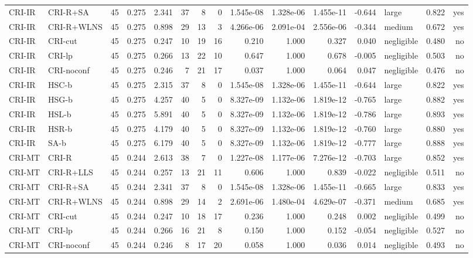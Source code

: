 \begin{table}[htbp]
\begin{tabular}{llrrrrrrrrrrlrr}
CRI-IR & CRI-R+SA & 45 & 0.275 & 2.341 & 37 & 8 & 0 & 1.545e-08 & 1.328e-06 & 1.455e-11 & -0.644 & large & 0.822 & yes \\
CRI-IR & CRI-R+WLNS & 45 & 0.275 & 0.898 & 29 & 13 & 3 & 4.266e-06 & 2.091e-04 & 2.556e-06 & -0.344 & medium & 0.672 & yes \\
CRI-IR & CRI-cut & 45 & 0.275 & 0.247 & 10 & 19 & 16 & 0.210 & 1.000 & 0.327 & 0.040 & negligible & 0.480 & no \\
CRI-IR & CRI-lp & 45 & 0.275 & 0.266 & 13 & 22 & 10 & 0.647 & 1.000 & 0.678 & -0.005 & negligible & 0.503 & no \\
CRI-IR & CRI-noconf & 45 & 0.275 & 0.246 & 7 & 21 & 17 & 0.037 & 1.000 & 0.064 & 0.047 & negligible & 0.476 & no \\
CRI-IR & HSC-b & 45 & 0.275 & 2.315 & 37 & 8 & 0 & 1.545e-08 & 1.328e-06 & 1.455e-11 & -0.644 & large & 0.822 & yes \\
CRI-IR & HSG-b & 45 & 0.275 & 4.257 & 40 & 5 & 0 & 8.327e-09 & 1.132e-06 & 1.819e-12 & -0.765 & large & 0.882 & yes \\
CRI-IR & HSL-b & 45 & 0.275 & 5.891 & 40 & 5 & 0 & 8.327e-09 & 1.132e-06 & 1.819e-12 & -0.786 & large & 0.893 & yes \\
CRI-IR & HSR-b & 45 & 0.275 & 4.179 & 40 & 5 & 0 & 8.327e-09 & 1.132e-06 & 1.819e-12 & -0.760 & large & 0.880 & yes \\
CRI-IR & SA-b & 45 & 0.275 & 6.179 & 40 & 5 & 0 & 8.327e-09 & 1.132e-06 & 1.819e-12 & -0.777 & large & 0.888 & yes \\
CRI-MT & CRI-R & 45 & 0.244 & 2.613 & 38 & 7 & 0 & 1.227e-08 & 1.177e-06 & 7.276e-12 & -0.703 & large & 0.852 & yes \\
CRI-MT & CRI-R+LLS & 45 & 0.244 & 0.257 & 13 & 21 & 11 & 0.606 & 1.000 & 0.839 & -0.022 & negligible & 0.511 & no \\
CRI-MT & CRI-R+SA & 45 & 0.244 & 2.341 & 37 & 8 & 0 & 1.545e-08 & 1.328e-06 & 1.455e-11 & -0.665 & large & 0.833 & yes \\
CRI-MT & CRI-R+WLNS & 45 & 0.244 & 0.898 & 29 & 14 & 2 & 2.691e-06 & 1.480e-04 & 4.629e-07 & -0.371 & medium & 0.685 & yes \\
CRI-MT & CRI-cut & 45 & 0.244 & 0.247 & 10 & 18 & 17 & 0.236 & 1.000 & 0.248 & 0.002 & negligible & 0.499 & no \\
CRI-MT & CRI-lp & 45 & 0.244 & 0.266 & 16 & 21 & 8 & 0.150 & 1.000 & 0.152 & -0.054 & negligible & 0.527 & no \\
CRI-MT & CRI-noconf & 45 & 0.244 & 0.246 & 8 & 17 & 20 & 0.058 & 1.000 & 0.036 & 0.014 & negligible & 0.493 & no \\

\end{tabular}
\end{table}

